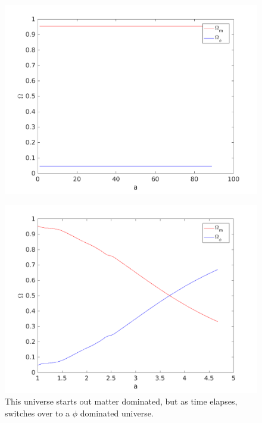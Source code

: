 \documentclass[12pt]{article}
\begin{document}
\begin{figure}
\centering
\includegraphics[width=5in]{omega_54b.png}
\caption{}
\end{figure}

\begin{figure}
\centering
\includegraphics[width=5in]{omega_54c.png}
\caption{This universe starts out matter dominated, but as time elapses, switches over to a $\phi$ dominated universe.}
\end{figure}
\end{document}
